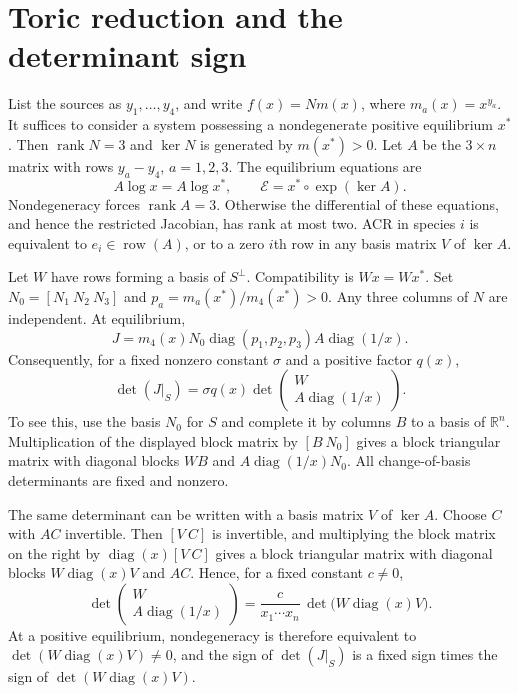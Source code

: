 \documentclass[11pt,a4paper]{report}
\providecommand{\R}{\mathbb{R}}
\providecommand{\rank}{\operatorname{rank}}
\providecommand{\diag}{\operatorname{diag}}
\begin{document}
\section{Toric reduction and the determinant sign}
List the sources as $y_1,\ldots,y_4$, and write $f(x)=N m(x)$, where $m_a(x)=x^{y_a}$.
It suffices to consider a system possessing a nondegenerate positive equilibrium $x^*$.
Then $\rank N=3$ and $\ker N$ is generated by $m(x^*)>0$.
Let $A$ be the $3\times n$ matrix with rows $y_a-y_4$, $a=1,2,3$.
The equilibrium equations are
\[
 A\log x=A\log x^*,\qquad
 \mathcal E=x^*\circ\exp(\ker A).
\]
Nondegeneracy forces $\rank A=3$. Otherwise the differential of these equations, and hence
the restricted Jacobian, has rank at most two. ACR in species $i$ is equivalent to
$e_i\in\operatorname{row}(A)$, or to a zero $i$th row in any basis matrix $V$ of $\ker A$.

Let $W$ have rows forming a basis of $S^\perp$. Compatibility is $Wx=Wx^*$.
Set $N_0=[N_1\ N_2\ N_3]$ and $p_a=m_a(x^*)/m_4(x^*)>0$.
Any three columns of $N$ are independent. At equilibrium,
\[
 J=m_4(x)N_0\diag(p_1,p_2,p_3)A\diag(1/x).
\]
Consequently, for a fixed nonzero constant $\sigma$ and a positive factor $q(x)$,
\begin{equation}\label{eq:orientation}
 \det(J|_S)=\sigma q(x)
 \det\begin{pmatrix}W\\ A\diag(1/x)\end{pmatrix}.
\end{equation}
To see this, use the basis $N_0$ for $S$ and complete it by columns $B$ to a basis of $\R^n$.
Multiplication of the displayed block matrix by $[B\ N_0]$ gives a block triangular matrix with
diagonal blocks $WB$ and $A\diag(1/x)N_0$. All change-of-basis determinants are fixed and nonzero.

The same determinant can be written with a basis matrix $V$ of $\ker A$. Choose $C$ with $AC$ invertible.
Then $[V\ C]$ is invertible, and multiplying the block matrix on the right by $\diag(x)[V\ C]$ gives a block
triangular matrix with diagonal blocks $W\diag(x)V$ and $AC$. Hence, for a fixed constant $c\ne0$,
\begin{equation}\label{eq:orientationV}
 \det\begin{pmatrix}W\\ A\diag(1/x)\end{pmatrix}
 =\frac{c}{x_1\cdots x_n}\,\det\bigl(W\diag(x)V\bigr).
\end{equation}
At a positive equilibrium, nondegeneracy is therefore equivalent to $\det(W\diag(x)V)\ne0$, and the sign
of $\det(J|_S)$ is a fixed sign times the sign of $\det(W\diag(x)V)$.
\end{document}
